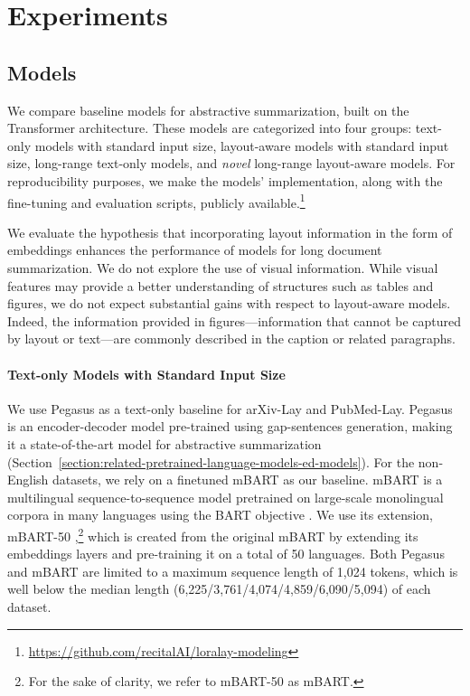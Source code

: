 \section{Experiments}

\subsection{Models}

We compare baseline models for abstractive summarization, built on the Transformer architecture. These models are categorized into four groups: text-only models with standard input size, layout-aware models with standard input size, long-range text-only models, and \textit{novel} long-range layout-aware models. For reproducibility purposes, we make the models' implementation, along with the fine-tuning and evaluation scripts, publicly available.\footnote{\url{https://github.com/recitalAI/loralay-modeling}}

We evaluate the hypothesis that incorporating layout information in the form of embeddings enhances the performance of models for long document summarization. We do not explore the use of visual information. While visual features may provide a better understanding of structures such as tables and figures, we do not expect substantial gains with respect to layout-aware models. Indeed, the information provided in figures—information that cannot be captured by layout or text—are commonly described in the caption or related paragraphs. 

\paragraph{Text-only Models with Standard Input Size}

We use Pegasus \citep{zhang2020pegasus} as a text-only baseline for arXiv-Lay and PubMed-Lay. Pegasus is an encoder-decoder model pre-trained using gap-sentences generation, making it a state-of-the-art model for abstractive summarization (Section~\ref{section:related-pretrained-language-models-ed-models}).
For the non-English datasets, we rely on a finetuned mBART as our baseline. mBART \citep{liu2020multilingual} is a multilingual sequence-to-sequence model pretrained on large-scale monolingual corpora in many languages using the BART objective \citep{lewis2019bart}. We use its extension, mBART-50 \citep{tang2020multilingual},\footnote{For the sake of clarity, we refer to mBART-50 as mBART.} which is created from the original mBART by extending its embeddings layers and pre-training it on a total of 50 languages. Both Pegasus and mBART are limited to a maximum sequence length of 1,024 tokens, which is well below the median length (6,225/3,761/4,074/4,859/6,090/5,094) of each dataset.

